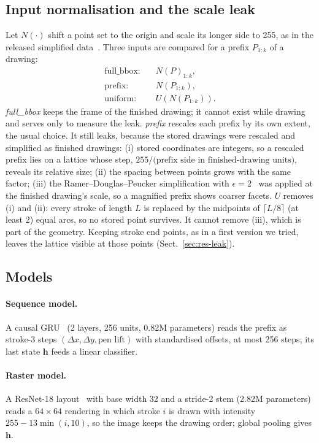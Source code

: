 \subsection{Input normalisation and the scale leak}
\label{sec:method-norm}
Let $N(\cdot)$ shift a point set to the origin and scale its longer side to 255, as in the
released simplified data~\cite{quickdraw_dataset}. Three inputs are compared for a prefix
$P_{1:k}$ of a drawing:
\begin{align}
\text{full\_bbox:}\quad & N(P)_{1:k}, \\
\text{prefix:}\quad & N(P_{1:k}), \\
\text{uniform:}\quad & U(N(P_{1:k})).
\end{align}
\emph{full\_bbox} keeps the frame of the finished drawing; it cannot exist while drawing and
serves only to measure the leak. \emph{prefix} rescales each prefix by its own extent, the usual
choice. It still leaks, because the stored drawings were rescaled and simplified as finished
drawings: (i) stored coordinates are integers, so a rescaled prefix lies on a lattice whose step,
$255/\text{(prefix side in finished-drawing units)}$, reveals its relative size; (ii) the spacing
between points grows with the same factor; (iii) the Ramer--Douglas--Peucker simplification with
$\epsilon = 2$~\cite{douglas1973} was applied at the finished drawing's scale, so a magnified prefix
shows coarser facets. $U$ removes (i) and (ii): every stroke of length $L$ is replaced by the
midpoints of $\lceil L/8 \rceil$ (at least 2) equal arcs, so no stored point survives. It cannot
remove (iii), which is part of the geometry. Keeping stroke end points, as in a first version we
tried, leaves the lattice visible at those points (Sect.~\ref{sec:res-leak}).

\subsection{Models}
\label{sec:method-models}
\paragraph{Sequence model.} A causal GRU~\cite{cho2014gru} (2 layers, 256 units, 0.82M
parameters) reads the prefix as stroke-3 steps $(\Delta x, \Delta y, \text{pen lift})$ with
standardised offsets, at most 256 steps; its last state $\mathbf{h}$ feeds a linear classifier.
\paragraph{Raster model.} A ResNet-18 layout~\cite{he2016resnet} with base width 32 and a
stride-2 stem (2.82M parameters) reads a $64\times64$ rendering in which stroke $i$ is drawn
with intensity $255-13\min(i,10)$, so the image keeps the drawing order; global pooling gives
$\mathbf{h}$.

